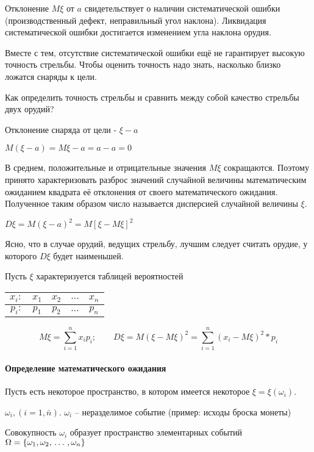 ﻿\documentclass[a4paper,12pt]{report}
\begin{document}
	Отклонение $M\xi$ от $a$ свидетельствует о наличии систематической ошибки (производственный дефект, неправильный угол наклона). Ликвидация систематической ошибки достигается изменением угла наклона орудия. 

	Вместе с тем, отсутствие систематической ошибки ещё не гарантирует высокую точность стрельбы. Чтобы оценить точность надо знать, насколько близко ложатся снаряды к цели. 

	Как определить точность стрельбы и сравнить между собой качество стрельбы двух орудий?

	Отклонение снаряда от цели - $\xi - a$
	
	$M(\xi - a) = M\xi - a = a - a = 0$

	В среднем, положительные и отрицательные значения $M\xi$ сокращаются. Поэтому принято характеризовать разброс значений случайной величины математическим ожиданием квадрата её отклонения от своего математического ожидания. Полученное таким образом число называется дисперсией случайной величины $\xi$. 

	$D\xi = M(\xi-a)^2 = M[\xi-M\xi]^2$

	Ясно, что в случае орудий, ведущих стрельбу, лучшим следует считать орудие, у которого $D\xi$ будет наименьшей.

	Пусть $\xi$ характеризуется таблицей вероятностей \strut


	\begin{tabular}{|r|c|c|c|c|}
	\hline
		$x_i:$ & $x_1$ & $x_2$ & $\ldots$ & $x_n$\\
	\hline	
		$p_i:$ & $p_1$ & $p_2$ & $\ldots$ & $p_n$\\
	\hline
	\end{tabular}

	
	$$
	  M\xi = \sum^n_{i=1}x_ip_i;
	  \qquad
	  D\xi = M (\xi - M\xi)^2 
	       = \sum^n_{i=1}(x_i-M\xi)^2*p_i
	$$



\paragraph{Определение математического ожидания}

	Пусть есть некоторое пространство, в котором имеется некоторое $\xi = \xi(\omega_i)$.

	$\omega_i,(i=1,\bar n)$. $\omega_i$ – неразделимое событие (пример: исходы броска монеты)

	Совокупность $\omega_i$ образует пространство элементарных событий
	$\Omega = \{ \omega_1, \omega_2, \,\ldots\,, \omega_n \}$
\end{document}
